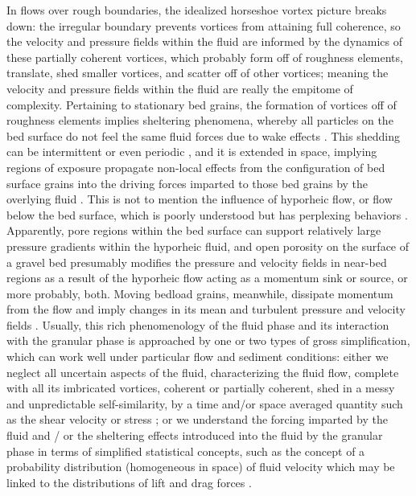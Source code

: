\documentclass{article}
\begin{document}
In flows over rough boundaries, the idealized horseshoe vortex picture breaks down: the irregular boundary prevents vortices from attaining full coherence, so the velocity and pressure fields within the fluid are informed by the dynamics of these partially coherent vortices, which probably form off of roughness elements, translate, shed smaller vortices, and scatter off of other vortices; meaning the velocity and pressure fields within the fluid are really the empitome of complexity.
Pertaining to stationary bed grains, the formation of vortices off of roughness elements implies sheltering phenomena, whereby all particles on the bed surface do not feel the same fluid forces due to wake effects \citep{Egiazoff1965, AnnaM2017}. 
This shedding can be intermittent or even periodic \citep{}, and it is extended in space, implying regions of exposure propagate non-local effects from the configuration of bed surface grains into the driving forces imparted to those bed grains by the overlying fluid \citep{McEwan2004}. 
This is not to mention the influence of hyporheic flow, or flow below the bed surface, which is poorly understood but has perplexing behaviors \citep{Cooper2017}.  
Apparently, pore regions within the bed surface can support relatively large pressure gradients within the hyporheic fluid, and open porosity on the surface of a gravel bed presumably modifies the pressure and velocity fields in near-bed regions as a result of the hyporheic flow acting as a momentum sink or source, or more probably, both. 
Moving bedload grains, meanwhile, dissipate momentum from the flow and imply changes in its mean and turbulent pressure and velocity fields \citep{Singh2010, Santos2014, Liu2016}. 
Usually, this rich phenomenology of the fluid phase and its interaction with the granular phase is approached by one or two types of gross simplification, which can work well under particular flow and sediment conditions: either we neglect all uncertain aspects of the fluid, characterizing the fluid flow, complete with all its imbricated vortices, coherent or partially coherent, shed in a messy and unpredictable self-similarity, by a time and/or space averaged quantity such as the shear velocity or stress \citep{Yalin1972, Stelczer1983}; or we understand the forcing imparted by the fluid and / or the sheltering effects introduced into the fluid by the granular phase in terms of simplified statistical concepts, such as the concept of a probability distribution (homogeneous in space) of fluid velocity \citep{Einstein1950, Paintal1971} which may be linked to the distributions of lift and drag forces \citep{Hofland2006, Schmeeckle2007}. 
\end{document}
